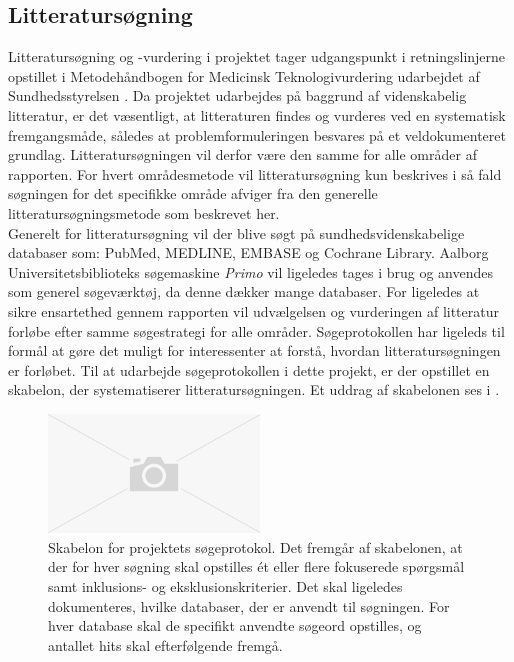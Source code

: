 \subsection{Litteratursøgning}
Litteratursøgning og -vurdering i projektet tager udgangspunkt i retningslinjerne opstillet i Metodehåndbogen for Medicinsk Teknologivurdering udarbejdet af Sundhedsstyrelsen \citep{metodehaandbogen}. Da projektet udarbejdes på baggrund af videnskabelig litteratur, er det væsentligt, at litteraturen findes og vurderes ved en systematisk fremgangsmåde, således at problemformuleringen besvares på et veldokumenteret grundlag. Litteratursøgningen vil derfor være den samme for alle områder af rapporten. For hvert områdesmetode vil litteratursøgning kun beskrives i så fald søgningen for det specifikke område afviger fra den generelle litteratursøgningsmetode som beskrevet her. \\
Generelt for litteratursøgning vil der blive søgt på sundhedsvidenskabelige databaser som: PubMed, MEDLINE, EMBASE og Cochrane Library. Aalborg Universitetsbiblioteks søgemaskine \textit{Primo} vil ligeledes tages i brug og anvendes som generel søgeværktøj, da denne dækker mange databaser. For ligeledes at sikre ensartethed gennem rapporten vil udvælgelsen og vurderingen af litteratur forløbe efter samme søgestrategi for alle områder. Søgeprotokollen har ligeleds til formål at gøre det muligt for interessenter at forstå, hvordan litteratursøgningen er forløbet. \citep{metodehaandbogen}
Til at udarbejde søgeprotokollen i dette projekt, er der opstillet en skabelon, der systematiserer litteratursøgningen. Et uddrag af skabelonen ses i .

\begin{figure}[H]
\begin{center}
\includegraphics[width=0.5\textwidth]{figures/cMetode/soegeprotokol}
\end{center}
\caption{Skabelon for projektets søgeprotokol. Det fremgår af skabelonen, at der for hver søgning skal opstilles ét eller flere fokuserede spørgsmål samt inklusions- og eksklusionskriterier. Det skal ligeledes dokumenteres, hvilke databaser, der er anvendt til søgningen. For hver database skal de specifikt anvendte søgeord opstilles, og antallet hits skal efterfølgende fremgå.}
\label{fig:soegeprotokol} 
\end{figure}

